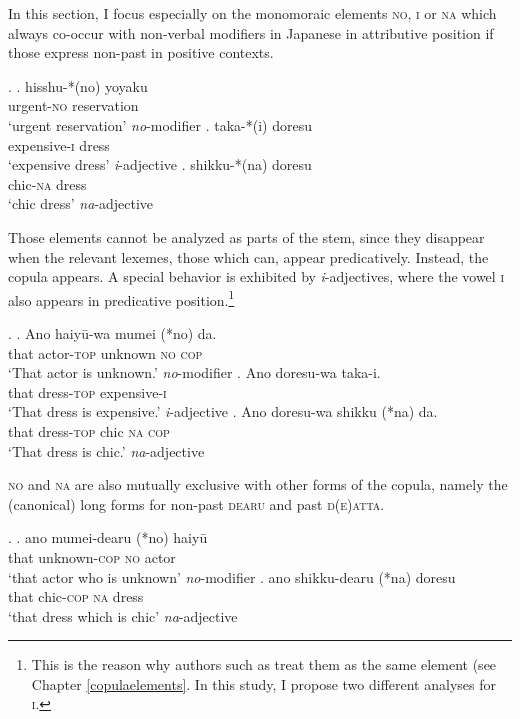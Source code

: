 \documentclass [output=book,colorlinks,citecolor=brown]{langscibook}
\begin{document}
In this section, I focus especially on the monomoraic elements \textsc{no}, \textsc{i} or \textsc{na} which always co-occur with non-verbal modifiers in Japanese in attributive position if those express non-past in positive contexts.

\ex. \ag. hisshu-*(no) yoyaku\\
urgent-\textsc{no} reservation\\
`urgent reservation’ \null \hfill \textit{no}-modifier \label{mumeino}
\bg. taka-*(i) doresu\\
expensive-\textsc{i} dress\\
`expensive dress' \null \hfill \textit{i}-adjective \label{takaimod1}
\cg. shikku-*(na) doresu\\
chic-\textsc{na} dress\\
`chic dress' \null \hfill \textit{na}-adjective \label{shikkunamod1}

Those elements cannot be analyzed as parts of the stem, since they disappear when the relevant lexemes, those which can, appear predicatively. Instead, the copula appears. A special behavior is exhibited by \textit{i}-adjectives, where the vowel \textsc{i} also appears in predicative position.\footnote{This is the reason why authors such as \citet{nishiyama:1999:adj} treat them as the same element (see Chapter \ref{copulaelements}. In this study, I propose two different analyses for \textsc{i}.}

\ex. \label{nopredicativeno} \ag. Ano haiyū-wa mumei (*no) da.\\
that actor-\textsc{top} unknown \textsc{no} \textsc{cop}\\
`That actor is unknown.’ \null \hfill \textit{no}-modifier
\bg. Ano doresu-wa taka-i.\\
that dress-\textsc{top} expensive-\textsc{i}\\
`That dress is expensive.' \null \hfill \textit{i}-adjective
\cg. Ano doresu-wa shikku (*na) da.\\
that dress-\textsc{top} chic \textsc{na} \textsc{cop}\\
`That dress is chic.' \null \hfill \textit{na}-adjective

\textsc{no} and \textsc{na} are also mutually exclusive with other forms of the copula, namely the (canonical) long forms for non-past \textsc{dearu} and past \textsc{d(e)atta}. %

\ex. \label{dearuno} \ag. ano mumei-dearu (*no) haiyū\\
that unknown-\textsc{cop} \textsc{no} actor\\
`that actor who is unknown' \null \hfill \textit{no}-modifier
\bg. ano shikku-dearu (*na) doresu\\
that chic-\textsc{cop} \textsc{na} dress\\
`that dress which is chic’ \null \hfill \textit{na}-adjective
\end{document}
